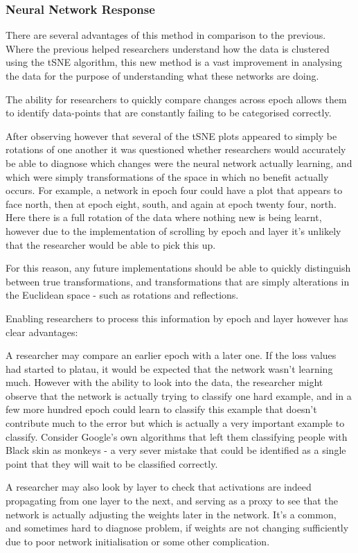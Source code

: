 \documentclass[a4paper,11pt,titlepage]{article}
\begin{document}
	
		\subsubsection{Neural Network Response}
		There are several advantages of this method in comparison to the previous. Where the previous helped researchers understand how the data is clustered using the tSNE algorithm, this new method is a vast improvement in analysing the data for the purpose of understanding what these networks are doing.
		\par 
		The ability for researchers to quickly compare changes across epoch allows them to identify data-points that are constantly failing to be categorised correctly.
		\par 
		After observing however that several of the tSNE plots appeared to simply be rotations of one another it was questioned whether researchers would accurately be able to diagnose which changes were the neural network actually learning, and which were simply transformations of the space in which no benefit actually occurs. For example, a network in epoch four could have a plot that appears to face north, then at epoch eight, south, and again at epoch twenty four, north. Here there is a full rotation of the data where nothing new is being learnt, however due to the implementation of scrolling by epoch and layer it's unlikely that the researcher would be able to pick this up.
		\par 
		For this reason, any future implementations should be able to quickly distinguish between true transformations, and transformations that are simply alterations in the Euclidean space - such as rotations and reflections.
		\par 
		Enabling researchers to process this information by epoch and layer however has clear advantages:
		\par 
		A researcher may compare an earlier epoch with a later one. If the loss values had started to platau, it would be expected that the network wasn't learning much. However with the ability to look into the data, the researcher might observe that the network is actually trying to classify one hard example, and in a few more hundred epoch could learn to classify this example that doesn't contribute much to the error but which is actually a very important example to classify. Consider Google's own algorithms that left them classifying people with Black skin as monkeys - a very sever mistake that could be identified as a single point that they will wait to be classified correctly.
		\par 
		A researcher may also look by layer to check that activations are indeed propagating from one layer to the next, and serving as a proxy to see that the network is actually adjusting the weights later in the network. It's a common, and sometimes hard to diagnose problem, if weights are not changing sufficiently due to poor network initialisation or some other complication.
\end{document}
